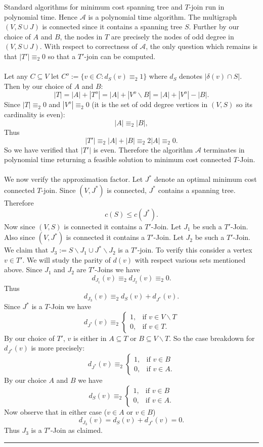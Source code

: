 \documentclass[letterpaper,12pt,oneside,onecolumn]{article}
\newcommand{\cA}{\mathcal{A}} \newcommand{\cB}{\mathcal{B}}
\newenvironment{proof}{{\bf Proof:  }}{\hfill\rule{2mm}{2mm}}
\begin{document}
\begin{proof}
Standard algorithms for minimum cost spanning tree and $T$-join run in polynomial time. Hence $\cA$ is a polynomial time algorithm. The multigraph $(V, S\cup J)$ is connected since it contains a spanning tree $S$. Further by our choice of $A$ and $B$, the nodes in $T$ are precisely the nodes of odd degree in $(V, S \cup J)$. With respect to correctness of $\cA$, the only question which remains is that $|T'| \equiv_2 0$ so that a $T'$-join can be computed. 
\paragraph{}
Let any $C \subseteq V$ let $C^o := \{ v \in C: d_S(v) \equiv_2 1 \}$ where $d_S$ denotes $|\delta(v) \cap S|$. Then by our choice of $A$ and $B$: 
$$|T| = |A| + |T^o| = |A| + |V^o\backslash B| = |A| + |V^o| - |B|.$$
Since $|T| \equiv_2 0$ and $|V^o| \equiv_2 0$ (it is the set of odd degree vertices in $(V,S)$ so its cardinality is even):
$$|A| \equiv_2 |B|,$$
Thus $$|T'| \equiv_2 |A| + |B| \equiv_2 2|A| \equiv_2 0.$$
So we have verified that $|T'|$ is even. Therefore the algorithm $\cA$ terminates in polynomial time returning a feasible solution to minimum cost connected $T$-Join.
\paragraph{}
We now verify the approximation factor. Let $J^*$ denote an optimal minimum cost connected $T$-join. Since $(V,J^*)$ is connected, $J^*$ contains a spanning tree. Therefore 
$$c(S) \leq c(J^*).$$
Now since $(V,S)$ is connected it contains a $T'$-Join. Let $J_1$ be such a $T'$-Join. Also since $(V,J^*)$ is connected it contains a $T'$-Join. Let $J_2$ be such a $T'$-Join. We claim that $J_3 := S\backslash J_1 \cup J^* \backslash J_2$ is a $T'$-join. To verify this consider a vertex $v \in T'$. We will study the parity of $d(v)$ with respect various sets mentioned above. Since $J_1$ and $J_2$ are $T'$-Joins we have
$$d_{J_1}(v) \equiv_2 d_{J_2}(v) \equiv_2 0.$$
Thus
$$d_{J_3}(v) \equiv_2 d_S(v) + d_{J^*}(v).$$
Since $J^*$ is a $T$-Join we have
$$d_{J^*}(v) \equiv_2 \begin{cases}
1, &\text{if } v \in V\backslash T \\
0, &\text{if } v \in T.
\end{cases}$$
By our choice of $T'$, $v$ is either in $A\subseteq T$ or $B\subseteq V\backslash T$. So the case breakdown for $d_{J^*}(v)$ is more precisely:
 $$d_{J^*}(v) \equiv_2 \begin{cases}
1, &\text{if } v \in B \\
0, &\text{if } v \in A.
\end{cases}$$
By our choice $A$ and $B$ we have
$$d_{S}(v) \equiv_2 \begin{cases}
1, &\text{if } v \in B \\
0, &\text{if } v \in A.
\end{cases}$$
Now observe that in either case ($v \in A$ or $v\in B$)
$$d_{J_3}(v) = d_S(v) + d_{J^*}(v) = 0.$$
Thus $J_3$ is a $T'$-Join as claimed.

\end{proof}
\end{document}
